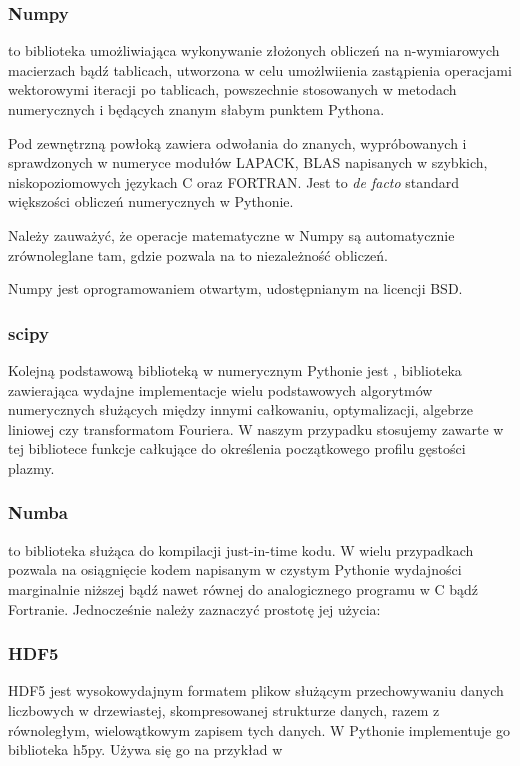 {    \subsubsection{Numpy}
     to biblioteka umożliwiająca wykonywanie złożonych obliczeń na n-wymiarowych macierzach
    bądź tablicach, utworzona w celu umożlwiienia zastąpienia operacjami wektorowymi iteracji po tablicach,
    powszechnie stosowanych w metodach numerycznych i będących znanym słabym punktem Pythona.

    Pod zewnętrzną powłoką zawiera odwołania do
    znanych, wypróbowanych i sprawdzonych w numeryce modułów LAPACK, BLAS
    napisanych w szybkich, niskopoziomowych językach C oraz FORTRAN.
    Jest to \emph{de facto}
    standard większości obliczeń numerycznych w Pythonie.

    Należy zauważyć, że operacje matematyczne w Numpy są automatycznie zrównoleglane 
    tam, gdzie pozwala na to niezależność obliczeń.

    Numpy jest oprogramowaniem otwartym, udostępnianym na licencji BSD. 

    \subsubsection{scipy}
    Kolejną podstawową biblioteką w numerycznym Pythonie jest , biblioteka
    zawierająca wydajne implementacje wielu podstawowych algorytmów numerycznych służących
    między innymi całkowaniu, optymalizacji, algebrze liniowej czy transformatom Fouriera.
    W naszym przypadku stosujemy zawarte w tej bibliotece funkcje całkujące do określenia
    początkowego profilu gęstości plazmy.

    \subsubsection{Numba}
     to biblioteka służąca do kompilacji just-in-time kodu.
    W wielu przypadkach
    pozwala na osiągnięcie kodem napisanym w czystym Pythonie wydajności marginalnie
    niższej bądź nawet równej do analogicznego programu w C bądź Fortranie. 
    Jednocześnie należy zaznaczyć prostotę jej użycia:



    \subsubsection{HDF5}
    HDF5 jest wysokowydajnym formatem plikow służącym przechowywaniu danych liczbowych w drzewiastej,
    skompresowanej strukturze danych, razem z równoległym, wielowątkowym zapisem tych danych.
    W Pythonie implementuje go biblioteka h5py. 
    Używa się go na przykład w 

}
